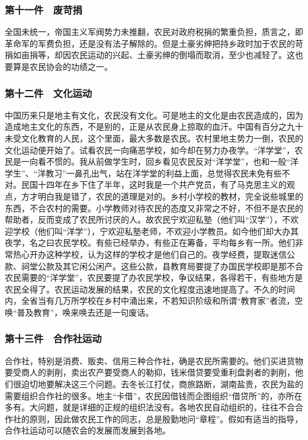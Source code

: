\documentclass[cn,11pt,chinese]{elegantbook}
\def\myformat#1{\hfil\hfil #1}
\begin{document}
\subsubsection*{\myformat{第十一件　废苛捐}}
全国未统一，帝国主义军阀势力未推翻，农民对政府税捐的繁重负担，质言之，即革命军的军费负担，还是没有法子解除的。但是土豪劣绅把持乡政时加于农民的苛捐如亩捐等，却因农民运动的兴起、土豪劣绅的倒塌而取消，至少也减轻了。这也要算是农民协会的功绩之一。\\
\subsubsection*{\myformat{第十二件　文化运动}}
中国历来只是地主有文化，农民没有文化。可是地主的文化是由农民造成的，因为造成地主文化的东西，不是别的，正是从农民身上掠取的血汗。中国有百分之九十未受文化教育的人民，这个里面，最大多数是农民。农村里地主势力一倒，农民的文化运动便开始了。试看农民一向痛恶学校，如今却在努力办夜学。“洋学堂”，农民是一向看不惯的。我从前做学生时，回乡看见农民反对“洋学堂”，也和一般“洋学生”、“洋教习”一鼻孔出气，站在洋学堂的利益上面，总觉得农民未免有些不对。民国十四年在乡下住了半年，这时我是一个共产党员，有了马克思主义的观点，方才明白我是错了，农民的道理是对的。乡村小学校的教材，完全说些城里的东西，不合农村的需要。小学教师对待农民的态度又非常之不好，不但不是农民的帮助者，反而变成了农民所讨厌的人。故农民宁欢迎私塾（他们叫“汉学”），不欢迎学校（他们叫“洋学”），宁欢迎私塾老师，不欢迎小学教员。如今他们却大办其夜学，名之曰农民学校。有些已经举办，有些正在筹备，平均每乡有一所。他们非常热心开办这种学校，认为这样的学校才是他们自己的。夜学经费，提取迷信公款、祠堂公款及其它闲公闲产。这些公款，县教育局要提了办国民学校即是那不合农民需要的“洋学堂”，农民要提了办农民学校，争议结果，各得若干，有些地方是农民全得了。农民运动发展的结果，农民的文化程度迅速地提高了。不久的时间内，全省当有几万所学校在乡村中涌出来，不若知识阶级和所谓“教育家”者流，空唤“普及教育”，唤来唤去还是一句废话。\\
\subsubsection*{\myformat{第十三件　合作社运动}}
合作社，特别是消费、贩卖、信用三种合作社，确是农民所需要的。他们买进货物要受商人的剥削，卖出农产要受商人的勒抑，钱米借贷要受重利盘剥者的剥削，他们很迫切地要解决这三个问题。去冬长江打仗，商旅路断，湖南盐贵，农民为盐的需要组织合作社的很多。地主“卡借”，农民因借钱而企图组织“借贷所”的，亦所在多有。大问题，就是详细的正规的组织法没有。各地农民自动组织的，往往不合合作社的原则，因此做农民工作的同志，总是殷勤地问“章程”。假如有适当的指导，合作社运动可以随农会的发展而发展到各地。\\
\end{document}
